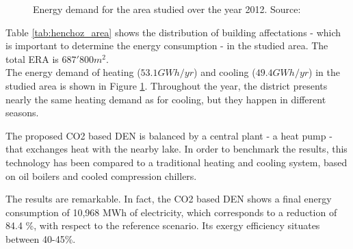 \documentclass{article}
\begin{document}
\begin{figure}[!htb]
\begin{minipage}{0.45\textwidth}
		\caption{Energy demand for the area studied over the year 2012. Source: \cite{henchozPotentialRefrigerantBased}}
		\label{fig:henchoz_energydemand}
	\end{minipage}
\end{figure}



Table \ref{tab:henchoz_area} shows the distribution of building affectations - which is important to determine the energy consumption - in the studied area. The total ERA is $687'800 m^{2}$.\\



The energy demand of heating ($53.1 GWh/yr$) and cooling ($49.4 GWh/yr$) in the studied area is shown in Figure \ref{fig:henchoz_energydemand}. Throughout the year, the district presents nearly the same heating demand as for cooling, but they happen in different seasons. 


The proposed CO2 based DEN is balanced by a central plant - a heat pump - that exchanges heat with the nearby lake. In order to benchmark the results, this technology has been compared to a traditional heating and cooling system, based on oil boilers and cooled compression chillers.

The results are remarkable. In fact, the CO2 based DEN shows a final energy consumption of 10,968 MWh of electricity, which corresponds to a reduction of 84.4 \%, with respect to the reference scenario. Its exergy efficiency situates between 40-45\%.
%
%
\end{document}

